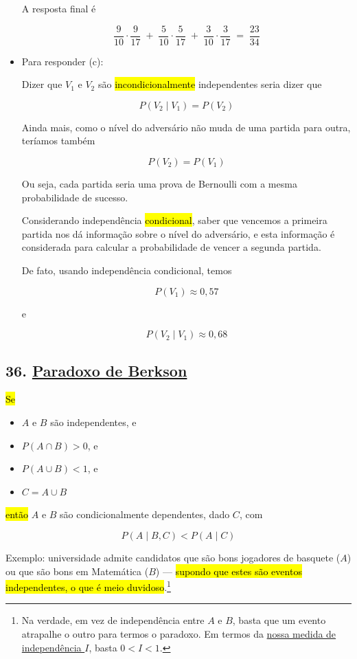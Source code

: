 \documentclass[
  11pt]{report}
\begin{document}
\begin{itemize}
  A resposta final é

  \[
  \frac{9}{10} \cdot \frac{9}{17} \;+\;
  \frac{5}{10} \cdot \frac{5}{17} \;+\;
  \frac{3}{10} \cdot \frac{3}{17}
  \;=\;
  \frac{23}{34}
  \]
\item
  Para responder (c):

  Dizer que $V_1$ e $V_2$ são {\hl{incondicionalmente}} independentes seria dizer que

  \[
  P(V_2 \mid V_1) = P(V_2)
  \]

  Ainda mais, como o nível do adversário não muda de uma partida para outra, teríamos também

  \[
  P(V_2) = P(V_1)
  \]

  Ou seja, cada partida seria uma prova de Bernoulli com a mesma probabilidade de sucesso.

  Considerando independência {\hl{condicional}}, saber que vencemos a primeira partida nos dá informação sobre o nível do adversário, e esta informação é considerada para calcular a probabilidade de vencer a segunda partida.

  De fato, usando independência condicional, temos

  \[
  P(V_1) \approx 0{,}57
  \]

  e

  \[
  P(V_2 \mid V_1) \approx 0{,}68
  \]
\end{itemize}

\hypertarget{paradoxo-de-berkson}{%
\subsection*{\texorpdfstring{36. \href{https://en.wikipedia.org/wiki/Berkson\%27s_paradox}{Paradoxo de Berkson}}{36. Paradoxo de Berkson}}\label{paradoxo-de-berkson}}

\begin{rmdbox}
{\hl{Se}}

\begin{itemize}
\item
  $A$ e $B$ são independentes, e
\item
  $P(A \cap B) > 0$, e
\item
  $P(A \cup B) < 1$, e
\item
  $C = A \cup B$
\end{itemize}

{\hl{então}} $A$ e $B$ são condicionalmente dependentes, dado $C$, com

\[
P(A \mid B, C) < P(A \mid C)
\]

Exemplo: universidade admite candidatos que são bons jogadores de basquete ($A$) ou que são bons em Matemática ($B$) --- {\hl{supondo que estes são eventos independentes, o que é meio duvidoso}}.\footnote{Na verdade, em vez de independência entre $A$ e $B$, basta que um evento atrapalhe o outro para termos o paradoxo. Em termos da \protect\hyperlink{i}{nossa medida de independência $I$}, basta $0< I < 1$.}

\end{rmdbox}
\end{document}

